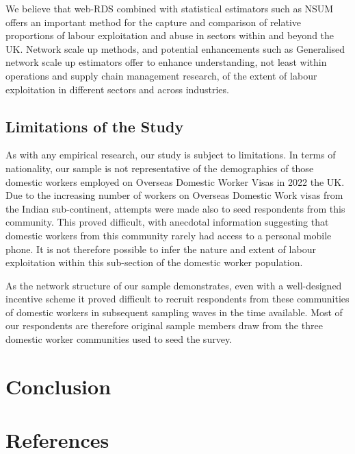 \documentclass[
  12pt,
  letterpaper,
  DIV=11,
  numbers=noendperiod]{scrartcl}
\theoremstyle{plain}
\theoremstyle{definition}
\begin{document}
We believe that web-RDS combined with statistical estimators such as
NSUM offers an important method for the capture and comparison of
relative proportions of labour exploitation and abuse in sectors within
and beyond the UK. Network scale up methods, and potential enhancements
such as Generalised network scale up estimators offer to enhance
understanding, not least within operations and supply chain management
research, of the extent of labour exploitation in different sectors and
across industries.

\subsection{Limitations of the Study}\label{limitations-of-the-study}

As with any empirical research, our study is subject to limitations. In
terms of nationality, our sample is not representative of the
demographics of those domestic workers employed on Overseas Domestic
Worker Visas in 2022 the UK. Due to the increasing number of workers on
Overseas Domestic Work visas from the Indian sub-continent, attempts
were made also to seed respondents from this community. This proved
difficult, with anecdotal information suggesting that domestic workers
from this community rarely had access to a personal mobile phone. It is
not therefore possible to infer the nature and extent of labour
exploitation within this sub-section of the domestic worker population.

As the network structure of our sample demonstrates, even with a
well-designed incentive scheme it proved difficult to recruit
respondents from these communities of domestic workers in subsequent
sampling waves in the time available. Most of our respondents are
therefore original sample members draw from the three domestic worker
communities used to seed the survey.

\section{Conclusion}\label{conclusion}

\newpage

\newpage

\printbibliography

\newpage

\section{References}\label{references}
\end{document}
